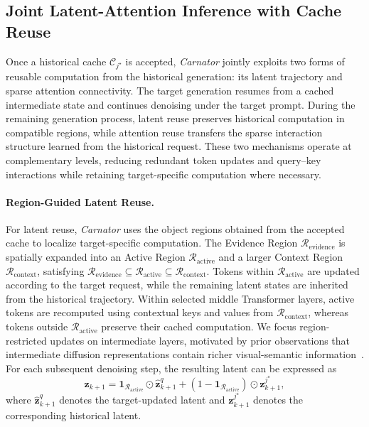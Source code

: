 \subsection{Joint Latent-Attention Inference with Cache Reuse}
\label{subsec-joint_reuse}

Once a historical cache $\mathcal{C}_{j^\star}$ is accepted, \emph{Carnator} jointly exploits two forms of reusable computation from the historical generation: its latent trajectory and sparse attention connectivity. The target generation resumes from a cached intermediate state and continues denoising under the target prompt. During the remaining generation process, latent reuse preserves historical computation in compatible regions, while attention reuse transfers the sparse interaction structure learned from the historical request. These two mechanisms operate at complementary levels, reducing redundant token updates and query--key interactions while retaining target-specific computation where necessary.

\paragraph{Region-Guided Latent Reuse.}
For latent reuse, \emph{Carnator} uses the object regions obtained from the accepted cache to localize target-specific computation. The Evidence Region $\mathcal{R}_{\mathrm{evidence}}$ is spatially expanded into an Active Region $\mathcal{R}_{\mathrm{active}}$ and a larger Context Region $\mathcal{R}_{\mathrm{context}}$, satisfying
$
\mathcal{R}_{\mathrm{evidence}}
\subseteq
\mathcal{R}_{\mathrm{active}}
\subseteq
\mathcal{R}_{\mathrm{context}}.
$
Tokens within $\mathcal{R}_{\mathrm{active}}$ are updated according to the target request, while the remaining latent states are inherited from the historical trajectory. Within selected middle Transformer layers, active tokens are recomputed using contextual keys and values from $\mathcal{R}_{\mathrm{context}}$, whereas tokens outside $\mathcal{R}_{\mathrm{active}}$ preserve their cached computation. We focus region-restricted updates on intermediate layers, motivated by prior observations that intermediate diffusion representations contain richer visual-semantic information~\citep{pnvr2023ld}. For each subsequent denoising step, the resulting latent can be expressed as
\begin{equation}
\mathbf{z}_{k+1}
=
\mathbf{1}_{\mathcal{R}_{\mathrm{active}}}
\odot
\widehat{\mathbf{z}}^{q}_{k+1}
+
\left(
1-\mathbf{1}_{\mathcal{R}_{\mathrm{active}}}
\right)
\odot
\mathbf{z}^{j^\star}_{k+1},
\label{eq_latent_reuse}
\end{equation}
where $\widehat{\mathbf{z}}^{q}_{k+1}$ denotes the target-updated latent and $\mathbf{z}^{j^\star}_{k+1}$ denotes the corresponding historical latent.


